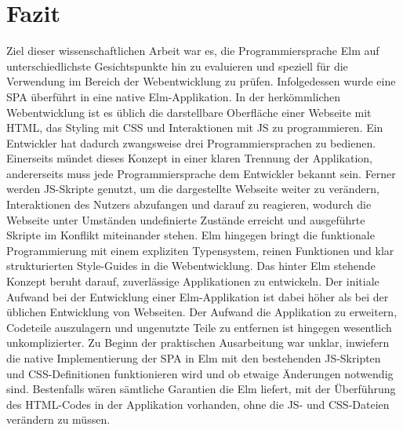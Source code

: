 \chapter{Fazit}
\label{chap:fazit}
Ziel dieser wissenschaftlichen Arbeit war es, die Programmiersprache Elm auf unterschiedlichste Gesichtspunkte hin zu evaluieren und speziell für die Verwendung im Bereich der Webentwicklung zu prüfen. Infolgedessen wurde eine \ac{SPA} überführt in eine native Elm-Applikation. In der herkömmlichen Webentwicklung ist es üblich die darstellbare Oberfläche einer Webseite mit \ac{HTML}, das Styling mit \ac{CSS} und Interaktionen mit \ac{JS} zu programmieren. Ein Entwickler hat dadurch zwangsweise drei Programmiersprachen zu bedienen. Einerseits mündet dieses Konzept in einer klaren Trennung der Applikation, andererseits muss jede Programmiersprache dem Entwickler bekannt sein. Ferner werden \ac{JS}-Skripte genutzt, um die dargestellte Webseite weiter zu verändern, Interaktionen des Nutzers abzufangen und darauf zu reagieren, wodurch die Webseite unter Umständen undefinierte Zustände erreicht und ausgeführte Skripte im Konflikt miteinander stehen.
Elm hingegen bringt die funktionale Programmierung mit einem expliziten Typensystem, reinen Funktionen und klar strukturierten Style-Guides in die Webentwicklung. Das hinter Elm stehende Konzept beruht darauf, zuverlässige Applikationen zu entwickeln. Der initiale Aufwand bei der Entwicklung einer Elm-Applikation ist dabei höher als bei der üblichen Entwicklung von Webseiten. Der Aufwand die Applikation zu erweitern, Codeteile auszulagern und ungenutzte Teile zu entfernen ist hingegen wesentlich unkomplizierter.
Zu Beginn der praktischen Ausarbeitung war unklar, inwiefern die native Implementierung der \ac{SPA} in Elm mit den bestehenden \ac{JS}-Skripten und \ac{CSS}-Definitionen funktionieren wird und ob etwaige Änderungen notwendig sind. Bestenfalls wären sämtliche Garantien die Elm liefert, mit der Überführung des \ac{HTML}-Codes in der Applikation vorhanden, ohne die \ac{JS}- und \ac{CSS}-Dateien verändern zu müssen.
